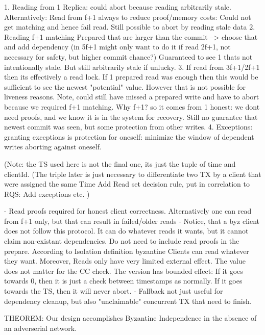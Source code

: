 1. Reading from 1 Replica: could abort because reading arbitrarily stale.
Alternatively: Read from f+1 always to reduce proof/memory costs: Could not get matching and hence fail read. Still possible to abort by reading stale data 
2. Reading f+1 matching Prepared that are larger than the commit --> choose that and add dependency (in 5f+1 might only want to do it if read 2f+1, not necessary for safety, but higher commit chance?)
Guaranteed to see 1 thats not intentionally stale. But still arbitrarily stale if unlucky.
3. If read from 3f+1/2f+1 then its effectively a read lock. 
If 1 prepared read was enough then this would be sufficient to see the newest "potential" value. However that is not possible for liveness reasons.
Note, could still have missed a prepared write and have to abort because we required f+1 matching. Why f+1? so it comes from 1 honest: we dont need proofs, and we know it is in the system for recovery.
Still no guarantee that newest commit was seen, but some protection from other writes.
4. Exceptions: granting exceptions is protection for oneself: minimize the window of dependent writes aborting against oneself. 

(Note: the TS used here is not the final one, its just the tuple of time and clientId. (The triple later is just necessary to differentiate two TX by a client that were assigned the same Time
Add Read set decision rule, put in correlation to RQS: 
Add exceptions etc.
)



- Read proofs required for honest client correctness. Alternatively one can read from f+1 only, but that can result in failed/older reads
- Notice, that a byz client does not follow this protocol. It can do whatever reads it wants, but it cannot claim non-existant dependencies. Do not need to include read proofs in the prepare. According to Isolation definition byzantine Clients can read whatever they want. Moreover, Reads only have very limited external effect. The value does not matter for the CC check. The version has bounded effect: If it goes towards 0, then it is just a check between timestamps as normally. If it goes towards the TS, then it will never abort.
- Fallback not just useful for dependency cleanup, but also "unclaimable" concurrent TX that need to finish.

THEOREM:
Our design accomplishes Byzantine Independence in the absence of an adverserial network.
